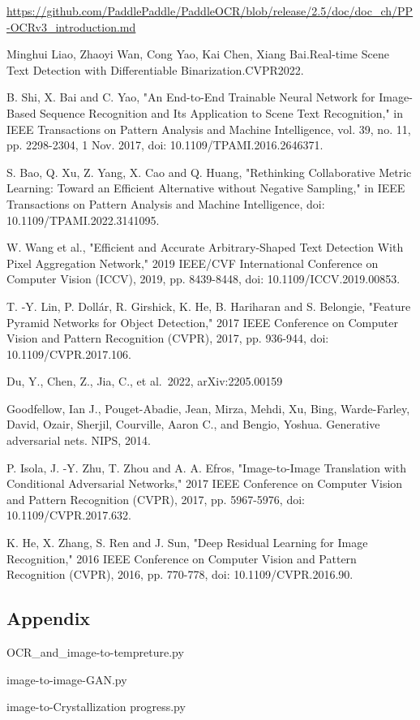 \documentclass[12pt]{apmcmthesis}
\begin{document}
\begin{thebibliography}{9}%
 \url{https://github.com/PaddlePaddle/PaddleOCR/blob/release/2.5/doc/doc_ch/PP-OCRv3_introduction.md}

Minghui Liao, Zhaoyi Wan, Cong Yao, Kai Chen, Xiang Bai.Real-time Scene Text Detection with Differentiable Binarization.CVPR2022.

B. Shi, X. Bai and C. Yao, "An End-to-End Trainable Neural Network for Image-Based Sequence Recognition and Its Application to Scene Text Recognition," in IEEE Transactions on Pattern Analysis and Machine Intelligence, vol. 39, no. 11, pp. 2298-2304, 1 Nov. 2017, doi: 10.1109/TPAMI.2016.2646371.

S. Bao, Q. Xu, Z. Yang, X. Cao and Q. Huang, "Rethinking Collaborative Metric Learning: Toward an Efficient Alternative without Negative Sampling," in IEEE Transactions on Pattern Analysis and Machine Intelligence, doi: 10.1109/TPAMI.2022.3141095.

W. Wang et al., "Efficient and Accurate Arbitrary-Shaped Text Detection With Pixel Aggregation Network," 2019 IEEE/CVF International Conference on Computer Vision (ICCV), 2019, pp. 8439-8448, doi: 10.1109/ICCV.2019.00853.
	
T. -Y. Lin, P. Dollár, R. Girshick, K. He, B. Hariharan and S. Belongie, "Feature Pyramid Networks for Object Detection," 2017 IEEE Conference on Computer Vision and Pattern Recognition (CVPR), 2017, pp. 936-944, doi: 10.1109/CVPR.2017.106.

 Du, Y., Chen, Z., Jia, C., et al.\ 2022, arXiv:2205.00159
	
 Goodfellow, Ian J., Pouget-Abadie, Jean, Mirza, Mehdi, Xu, Bing, Warde-Farley, David, Ozair, Sherjil, Courville, Aaron C., and Bengio, Yoshua. Generative adversarial nets. NIPS, 2014.

P. Isola, J. -Y. Zhu, T. Zhou and A. A. Efros, "Image-to-Image Translation with Conditional Adversarial Networks," 2017 IEEE Conference on Computer Vision and Pattern Recognition (CVPR), 2017, pp. 5967-5976, doi: 10.1109/CVPR.2017.632.

K. He, X. Zhang, S. Ren and J. Sun, "Deep Residual Learning for Image Recognition," 2016 IEEE Conference on Computer Vision and Pattern Recognition (CVPR), 2016, pp. 770-778, doi: 10.1109/CVPR.2016.90.
\end{thebibliography}


\newpage


	\begin{appendices}
	\section{Appendix}
	OCR\_and\_image-to-tempreture.py
	
	image-to-image-GAN.py
	
	image-to-Crystallization progress.py
	
\end{appendices}
\end{document}
